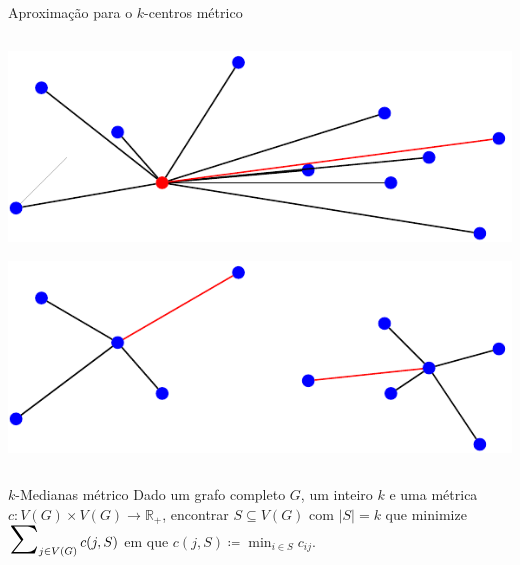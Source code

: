 \documentclass[final]{beamer}
\begin{document}
\begin{frame}[t]
\begin{columns}[t]
\begin{column}{0.47\paperwidth}
\begin{block}{Aproximação para o $k$-centros métrico}
\begin{columns}
         \begin{column}{0.23\paperwidth}
          \begin{tcolorbox}
            \includegraphics[scale=1.2]{imgs/cent2.pdf}
          \end{tcolorbox}

          \begin{tcolorbox}
            \includegraphics[scale=1.2]{imgs/cent4.pdf}
          \end{tcolorbox}
        \end{column}
      \end{columns}

\end{block}

\begin{alertblock}{$k$-Medianas métrico}
  Dado um grafo completo $G$, um inteiro $k$ e uma métrica $c : V(G)\times V(G) \rightarrow \mathbb{R}_+$, encontrar $S \subseteq V(G)$ com $|S| = k$ que minimize $\scalebox{2}{$\sum$}_{j \in V(G)}\, c(j,S)$ em que $c(j,S) \coloneqq \min_{i \in S} c_{ij}$.
\end{alertblock}


\end{column}
\end{columns}
\end{frame}
\end{document}
